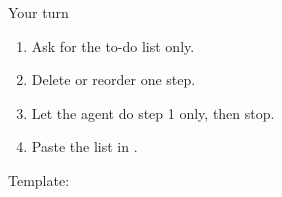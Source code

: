\begin{frame}{Your turn}
  \vspace{0.3em}
  \begin{enumerate}
    \item Ask for the to-do list only.
    \item Delete or reorder one step.
    \item Let the agent do step 1 only, then stop.
    \item Paste the list in .
  \end{enumerate}
  \vspace{0.5em}
  {\small Template: }
\end{frame}

